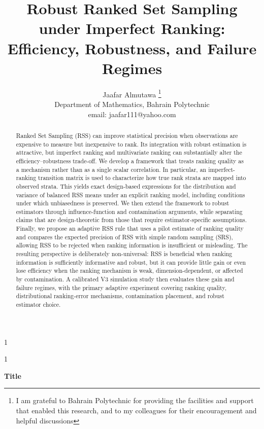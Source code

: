 \documentclass[12pt]{article}
\newcommand{\anon}{1}
\begin{document}
\def\spacingset#1{\renewcommand{\baselinestretch}%
{#1}\small\normalsize} \spacingset{1}




\anon
{
  \title{\bf
  Robust Ranked Set Sampling under Imperfect Ranking: Efficiency, Robustness, and Failure Regimes
  }
  \author{Jaafar Almutawa \thanks{
I am grateful to Bahrain Polytechnic for providing the facilities and support that enabled this research, and to my colleagues for their encouragement and helpful discussions}\hspace{.2cm}\\
    Department of Mathematics, Bahrain Polytechnic\\
    email: jaafar111@yahoo.com
}
  \maketitle
} \fi

\anon
{
  \bigskip
  \bigskip
  \bigskip
  \begin{center}
    {\LARGE\bf Title}
\end{center}
  \medskip
} \fi

\bigskip
\begin{abstract}
Ranked Set Sampling (RSS) can improve statistical precision when observations are expensive to measure but inexpensive to rank. Its integration with robust estimation is attractive, but imperfect ranking and multivariate ranking can substantially alter the efficiency--robustness trade-off. We develop a framework that treats ranking quality as a mechanism rather than as a single scalar correlation. In particular, an imperfect-ranking transition matrix is used to characterize how true rank strata are mapped into observed strata. This yields exact design-based expressions for the distribution and variance of balanced RSS means under an explicit ranking model, including conditions under which unbiasedness is preserved. We then extend the framework to robust estimators through influence-function and contamination arguments, while separating claims that are design-theoretic from those that require estimator-specific assumptions. Finally, we propose an adaptive RSS rule that uses a pilot estimate of ranking quality and compares the expected precision of RSS with simple random sampling (SRS), allowing RSS to be rejected when ranking information is insufficient or misleading. The resulting perspective is deliberately non-universal: RSS is beneficial when ranking information is sufficiently informative and robust, but it can provide little gain or even lose efficiency when the ranking mechanism is weak, dimension-dependent, or affected by contamination. A calibrated V3 simulation study then evaluates these gain and failure regimes, with the primary adaptive experiment covering ranking quality, distributional ranking-error mechanisms, contamination placement, and robust estimator choice.
\end{abstract}
\end{document}
